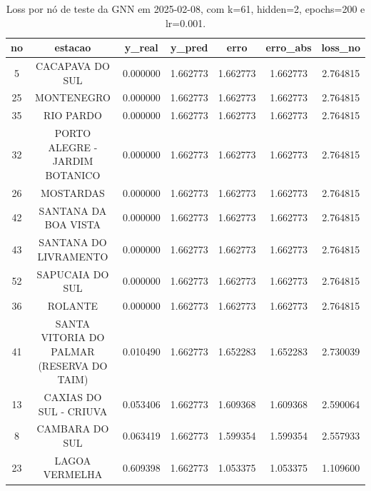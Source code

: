 \begin{table}[h]
\centering
\caption{Loss por nó de teste da GNN em 2025-02-08, com k=61, hidden=2, epochs=200 e lr=0.001.}
\label{tab:gnn_loss_nodes_k61_hidden2}
\begin{tabular}{ccccccc}
\toprule
no & estacao & y\_real & y\_pred & erro & erro\_abs & loss\_no \\
\midrule
5 & CACAPAVA DO SUL & 0.000000 & 1.662773 & 1.662773 & 1.662773 & 2.764815 \\
25 & MONTENEGRO & 0.000000 & 1.662773 & 1.662773 & 1.662773 & 2.764815 \\
35 & RIO PARDO & 0.000000 & 1.662773 & 1.662773 & 1.662773 & 2.764815 \\
32 & PORTO ALEGRE - JARDIM BOTANICO & 0.000000 & 1.662773 & 1.662773 & 1.662773 & 2.764815 \\
26 & MOSTARDAS & 0.000000 & 1.662773 & 1.662773 & 1.662773 & 2.764815 \\
42 & SANTANA DA BOA VISTA & 0.000000 & 1.662773 & 1.662773 & 1.662773 & 2.764815 \\
43 & SANTANA DO LIVRAMENTO & 0.000000 & 1.662773 & 1.662773 & 1.662773 & 2.764815 \\
52 & SAPUCAIA DO SUL & 0.000000 & 1.662773 & 1.662773 & 1.662773 & 2.764815 \\
36 & ROLANTE & 0.000000 & 1.662773 & 1.662773 & 1.662773 & 2.764815 \\
41 & SANTA VITORIA DO PALMAR (RESERVA DO TAIM) & 0.010490 & 1.662773 & 1.652283 & 1.652283 & 2.730039 \\
13 & CAXIAS DO SUL - CRIUVA & 0.053406 & 1.662773 & 1.609368 & 1.609368 & 2.590064 \\
8 & CAMBARA DO SUL & 0.063419 & 1.662773 & 1.599354 & 1.599354 & 2.557933 \\
23 & LAGOA VERMELHA & 0.609398 & 1.662773 & 1.053375 & 1.053375 & 1.109600 \\
\bottomrule
\end{tabular}
\end{table}
